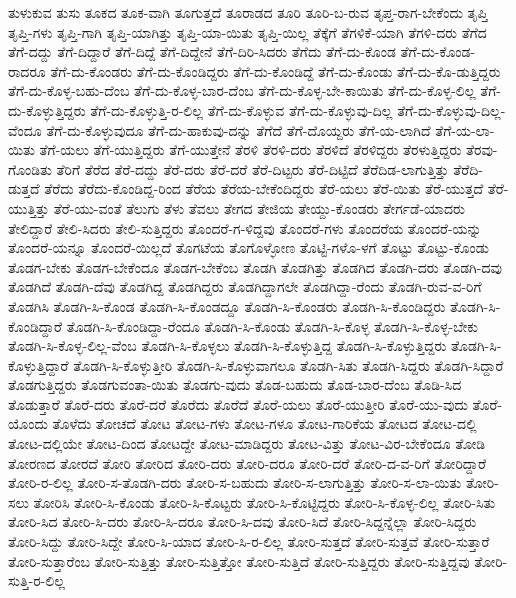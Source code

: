 {ತುಳುಕುವ
ತುಸು
ತೂಕದ
ತೂಕ-ವಾಗಿ
ತೂಗುತ್ತದೆ
ತೂರಾಡದ
ತೂರಿ
ತೂರಿ-ಬ-ರುವ
ತೃಪ್ತ-ರಾಗ-ಬೇಕೆಂದು
ತೃಪ್ತಿ
ತೃಪ್ತಿ-ಗಳು
ತೃಪ್ತಿ-ಗಾಗಿ
ತೃಪ್ತಿ-ಯಾಗಿತ್ತು
ತೃಪ್ತಿ-ಯಾ-ಯಿತು
ತೃಪ್ತಿ-ಯಿಲ್ಲ
ತೆಕ್ಕೆಗೆ
ತೆಗಳಿಕೆ-ಯಾಗಿ
ತೆಗಳಿ-ದರು
ತೆಗೆದ
ತೆಗೆ-ದದ್ದು
ತೆಗೆ-ದಿದ್ದಾರೆ
ತೆಗೆ-ದಿದ್ದೆ
ತೆಗೆ-ದಿದ್ದೇನೆ
ತೆಗೆ-ದಿರಿ-ಸಿದರು
ತೆಗೆದು
ತೆಗೆ-ದು-ಕೊಂಡ
ತೆಗೆ-ದು-ಕೊಂಡ-ರಾದರೂ
ತೆಗೆ-ದು-ಕೊಂಡರು
ತೆಗೆ-ದು-ಕೊಂಡಿದ್ದರು
ತೆಗೆ-ದು-ಕೊಂಡಿದ್ದೆ
ತೆಗೆ-ದು-ಕೊಂಡು
ತೆಗೆ-ದು-ಕೊ-ಡುತ್ತಿದ್ದರು
ತೆಗೆ-ದು-ಕೊಳ್ಳ-ಬಹು-ದೆಂಬ
ತೆಗೆ-ದು-ಕೊಳ್ಳ-ಬಾರ-ದೆಂಬ
ತೆಗೆ-ದು-ಕೊಳ್ಳ-ಬೇ-ಕಾಯಿತು
ತೆಗೆ-ದು-ಕೊಳ್ಳ-ಲಿಲ್ಲ
ತೆಗೆ-ದು-ಕೊಳ್ಳುತ್ತಿದ್ದರು
ತೆಗೆ-ದು-ಕೊಳ್ಳುತ್ತಿ-ರ-ಲಿಲ್ಲ
ತೆಗೆ-ದು-ಕೊಳ್ಳುವ
ತೆಗೆ-ದು-ಕೊಳ್ಳುವು-ದಿಲ್ಲ
ತೆಗೆ-ದು-ಕೊಳ್ಳುವು-ದಿಲ್ಲ-ವೆಂದೂ
ತೆಗೆ-ದು-ಕೊಳ್ಳುವುದೂ
ತೆಗೆ-ದು-ಹಾಕುವು-ದನ್ನು
ತೆಗೆದೆ
ತೆಗೆ-ದೊಯ್ದರು
ತೆಗೆ-ಯ-ಲಾಗಿದೆ
ತೆಗೆ-ಯ-ಲಾ-ಯಿತು
ತೆಗೆ-ಯಲು
ತೆಗೆ-ಯುತ್ತಿದ್ದರು
ತೆಗೆ-ಯುತ್ತೇನೆ
ತೆರಳಿ
ತೆರಳಿ-ದರು
ತೆರಳಿದೆ
ತೆರಳಿದ್ದರು
ತೆರಳುತ್ತಿದ್ದರು
ತೆರವು-ಗೊಂಡಿತು
ತೆರಿಗೆ
ತೆರೆದ
ತೆರೆ-ದದ್ದು
ತೆರೆ-ದರು
ತೆರೆ-ದರೆ
ತೆರೆ-ದಿಟ್ಟರು
ತೆರೆ-ದಿಟ್ಟಿದೆ
ತೆರೆದಿಡ-ಲಾಗುತ್ತಿತ್ತು
ತೆರೆದಿ-ಡುತ್ತದೆ
ತೆರೆದು
ತೆರೆದು-ಕೊಂಡಿದ್ದ-ರಿಂದ
ತೆರೆಯ
ತೆರೆಯ-ಬೇಕೆಂದಿದ್ದರು
ತೆರೆ-ಯಲು
ತೆರೆ-ಯಿತು
ತೆರೆ-ಯುತ್ತದೆ
ತೆರೆ-ಯುತ್ತಿತ್ತು
ತೆರೆ-ಯು-ವಂತೆ
ತೆಲುಗು
ತೆಳು
ತೆವಲು
ತೇಗದ
ತೇಜಿಯ
ತೇಯ್ದು-ಕೊಂಡರು
ತೇರ್ಗಡೆ-ಯಾದರು
ತೇಲಿದ್ದಾರೆ
ತೇಲಿ-ಸಿದರು
ತೇಲಿ-ಸುತ್ತಿದ್ದರು
ತೊಂದರೆ-ಗ-ಳಿದ್ದವು
ತೊಂದರೆ-ಗಳು
ತೊಂದರೆಯ
ತೊಂದರೆ-ಯನ್ನು
ತೊಂದರೆ-ಯನ್ನೂ
ತೊಂದರೆ-ಯಿಲ್ಲದೆ
ತೊಗಟೆಯ
ತೊಗೊಳ್ಳೋಣ
ತೊಟ್ಟಿ-ಗಳೊ-ಳಗೆ
ತೊಟ್ಟು
ತೊಟ್ಟು-ಕೊಂಡು
ತೊಡಗ-ಬೇಕು
ತೊಡಗ-ಬೇಕೆಂದೂ
ತೊಡಗ-ಬೇಕೆಂಬ
ತೊಡಗಿ
ತೊಡಗಿತ್ತು
ತೊಡಗಿದ
ತೊಡಗಿ-ದರು
ತೊಡಗಿ-ದವು
ತೊಡಗಿದೆ
ತೊಡಗಿ-ದೆವು
ತೊಡಗಿದ್ದ
ತೊಡಗಿದ್ದರು
ತೊಡಗಿದ್ದಾಗಲೇ
ತೊಡಗಿದ್ದಾ-ರೆಂದು
ತೊಡಗಿ-ರುವ-ವ-ರಿಗೆ
ತೊಡಗಿಸಿ
ತೊಡಗಿ-ಸಿ-ಕೊಂಡ
ತೊಡಗಿ-ಸಿ-ಕೊಂಡದ್ದೂ
ತೊಡಗಿ-ಸಿ-ಕೊಂಡರು
ತೊಡಗಿ-ಸಿ-ಕೊಂಡಿದ್ದರು
ತೊಡಗಿ-ಸಿ-ಕೊಂಡಿದ್ದಾರೆ
ತೊಡಗಿ-ಸಿ-ಕೊಂಡಿದ್ದಾ-ರೆಂದೂ
ತೊಡಗಿ-ಸಿ-ಕೊಂಡು
ತೊಡಗಿ-ಸಿ-ಕೊಳ್ಳ
ತೊಡಗಿ-ಸಿ-ಕೊಳ್ಳ-ಬೇಕು
ತೊಡಗಿ-ಸಿ-ಕೊಳ್ಳ-ಲಿಲ್ಲ-ವೆಂಬ
ತೊಡಗಿ-ಸಿ-ಕೊಳ್ಳಲು
ತೊಡಗಿ-ಸಿ-ಕೊಳ್ಳುತ್ತಿದ್ದ
ತೊಡಗಿ-ಸಿ-ಕೊಳ್ಳುತ್ತಿದ್ದರು
ತೊಡಗಿ-ಸಿ-ಕೊಳ್ಳುತ್ತಿದ್ದಾರೆ
ತೊಡಗಿ-ಸಿ-ಕೊಳ್ಳುತ್ತೀರಿ
ತೊಡಗಿ-ಸಿ-ಕೊಳ್ಳುವಾಗಲೂ
ತೊಡಗಿ-ಸಿತು
ತೊಡಗಿ-ಸಿದ್ದರು
ತೊಡಗಿ-ಸಿದ್ದಾರೆ
ತೊಡಗುತ್ತಿದ್ದರು
ತೊಡಗುವಂತಾ-ಯಿತು
ತೊಡಗು-ವುದು
ತೊಡ-ಬಹುದು
ತೊಡ-ಬಾರ-ದೆಂಬ
ತೊಡಿ-ಸಿದ
ತೊಡುತ್ತಾರೆ
ತೊರೆ-ದರು
ತೊರೆ-ದರೆ
ತೊರೆದು
ತೊರೆದೆ
ತೊರೆ-ಯಲು
ತೊರೆ-ಯುತ್ತೀರಿ
ತೊರೆ-ಯು-ವುದು
ತೊರೆ-ಯೊಂದು
ತೊಳೆದು
ತೋಚದೆ
ತೋಟ
ತೋಟ-ಗಳು
ತೋಟ-ಗಳೂ
ತೋಟ-ಗಾರಿಕೆಯ
ತೋಟದ
ತೋಟ-ದಲ್ಲಿ
ತೋಟ-ದಲ್ಲಿಯೇ
ತೋಟ-ದಿಂದ
ತೋಟದ್ದೇ
ತೋಟ-ಮಾಡಿದ್ದರು
ತೋಟ-ವಿತ್ತು
ತೋಟ-ವಿರ-ಬೇಕೆಂದೂ
ತೋಡಿ
ತೋರಣದ
ತೋರದೆ
ತೋರಿ
ತೋರಿದ
ತೋರಿ-ದರು
ತೋರಿ-ದರೂ
ತೋರಿ-ದರೆ
ತೋರಿ-ದ-ವ-ರಿಗೆ
ತೋರಿದ್ದಾರೆ
ತೋರಿ-ರ-ಲಿಲ್ಲ
ತೋರಿ-ಸ-ತೊಡಗಿ-ದರು
ತೋರಿ-ಸ-ಬಹುದು
ತೋರಿ-ಸ-ಲಾಗುತ್ತಿತ್ತು
ತೋರಿ-ಸ-ಲಾ-ಯಿತು
ತೋರಿ-ಸಲು
ತೋರಿಸಿ
ತೋರಿ-ಸಿ-ಕೊಂಡು
ತೋರಿ-ಸಿ-ಕೊಟ್ಟರು
ತೋರಿ-ಸಿ-ಕೊಟ್ಟಿದ್ದರು
ತೋರಿ-ಸಿ-ಕೊಳ್ಳ-ಲಿಲ್ಲ
ತೋರಿ-ಸಿತು
ತೋರಿ-ಸಿದ
ತೋರಿ-ಸಿ-ದರು
ತೋರಿ-ಸಿ-ದರೂ
ತೋರಿ-ಸಿ-ದವು
ತೋರಿ-ಸಿದೆ
ತೋರಿ-ಸಿದ್ದನ್ನೆಲ್ಲಾ
ತೋರಿ-ಸಿದ್ದರು
ತೋರಿ-ಸಿದ್ದು
ತೋರಿ-ಸಿದ್ದೇ
ತೋರಿ-ಸಿ-ಯಾದ
ತೋರಿ-ಸಿ-ರ-ಲಿಲ್ಲ
ತೋರಿ-ಸುತ್ತದೆ
ತೋರಿ-ಸುತ್ತವೆ
ತೋರಿ-ಸುತ್ತಾರೆ
ತೋರಿ-ಸುತ್ತಾರೆಂಬ
ತೋರಿ-ಸುತ್ತಿತ್ತು
ತೋರಿ-ಸುತ್ತಿತ್ತೋ
ತೋರಿ-ಸುತ್ತಿದೆ
ತೋರಿ-ಸುತ್ತಿದ್ದರು
ತೋರಿ-ಸುತ್ತಿದ್ದವು
ತೋರಿ-ಸುತ್ತಿ-ರ-ಲಿಲ್ಲ
}
